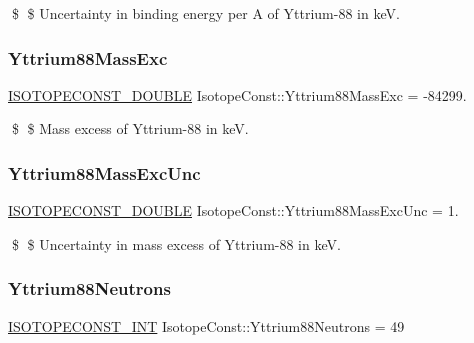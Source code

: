 \$ \$ Uncertainty in binding energy per A of Yttrium-\/88 in keV. \mbox{\label{group___isotope_const-_yttrium-_y88_ga8de31bc72ec78942a984540e048a074f}} 
\subsubsection{\texorpdfstring{Yttrium88\+Mass\+Exc}{Yttrium88MassExc}}
{\footnotesize\ttfamily \mbox{\hyperlink{group___isotope_const-_macros_ga8f45a7272ce02c0b4c65c44636ed719a}{I\+S\+O\+T\+O\+P\+E\+C\+O\+N\+S\+T\+\_\+\+D\+O\+U\+B\+LE}} Isotope\+Const\+::\+Yttrium88\+Mass\+Exc = -\/84299.}

\$ \$ Mass excess of Yttrium-\/88 in keV. \mbox{\label{group___isotope_const-_yttrium-_y88_ga2f3b18e99e3fe6a1d5d747da55159fad}} 
\subsubsection{\texorpdfstring{Yttrium88\+Mass\+Exc\+Unc}{Yttrium88MassExcUnc}}
{\footnotesize\ttfamily \mbox{\hyperlink{group___isotope_const-_macros_ga8f45a7272ce02c0b4c65c44636ed719a}{I\+S\+O\+T\+O\+P\+E\+C\+O\+N\+S\+T\+\_\+\+D\+O\+U\+B\+LE}} Isotope\+Const\+::\+Yttrium88\+Mass\+Exc\+Unc = 1.}

\$ \$ Uncertainty in mass excess of Yttrium-\/88 in keV. \mbox{\label{group___isotope_const-_yttrium-_y88_ga41d5ff9420736dba5a623ab70f958ec2}} 
\subsubsection{\texorpdfstring{Yttrium88\+Neutrons}{Yttrium88Neutrons}}
{\footnotesize\ttfamily \mbox{\hyperlink{group___isotope_const-_macros_ga5f18360b3e99483a35c32d789e62621c}{I\+S\+O\+T\+O\+P\+E\+C\+O\+N\+S\+T\+\_\+\+I\+NT}} Isotope\+Const\+::\+Yttrium88\+Neutrons = 49}

